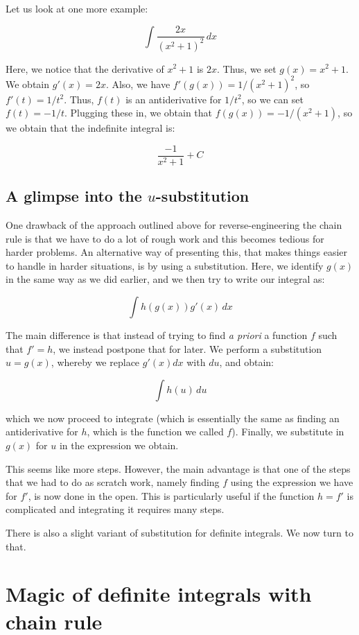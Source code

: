 \documentclass{amsart}
\begin{document}
Let us look at one more example:

$$\int \frac{2x}{(x^2 + 1)^2} \, dx$$

Here, we notice that the derivative of $x^2 + 1$ is $2x$. Thus, we set
$g(x) = x^2 + 1$. We obtain $g'(x) = 2x$. Also, we have $f'(g(x)) =
1/(x^2 + 1)^2$, so $f'(t) = 1/t^2$. Thus, $f(t)$ is an antiderivative
for $1/t^2$, so we can set $f(t) = -1/t$. Plugging these in, we obtain
that $f(g(x)) = -1/(x^2 + 1)$, so we obtain that the indefinite
integral is:

$$\frac{-1}{x^2 + 1} + C$$

\subsection*{A glimpse into the $u$-substitution}

One drawback of the approach outlined above for reverse-engineering
the chain rule is that we have to do a lot of rough work and this
becomes tedious for harder problems. An alternative way of presenting
this, that makes things easier to handle in harder situations, is by
using a substitution. Here, we identify $g(x)$ in the same way as we
did earlier, and we then try to write our integral as:

$$\int h(g(x))g'(x) \, dx$$

The main difference is that instead of trying to find {\em a priori} a
function $f$ such that $f' = h$, we instead postpone that for
later. We perform a substitution $u = g(x)$, whereby we replace $g'(x)
dx$ with $du$, and obtain:

$$\int h(u) \, du$$

which we now proceed to integrate (which is essentially the same as
finding an antiderivative for $h$, which is the function we called
$f$). Finally, we substitute in $g(x)$ for $u$ in the expression we
obtain.

This seems like more steps. However, the main advantage is that one of
the steps that we had to do as scratch work, namely finding $f$ using
the expression we have for $f'$, is now done in the open. This is
particularly useful if the function $h = f'$ is complicated and
integrating it requires many steps.

There is also a slight variant of substitution for definite
integrals. We now turn to that.

\section{Magic of definite integrals with chain rule}
\end{document}
